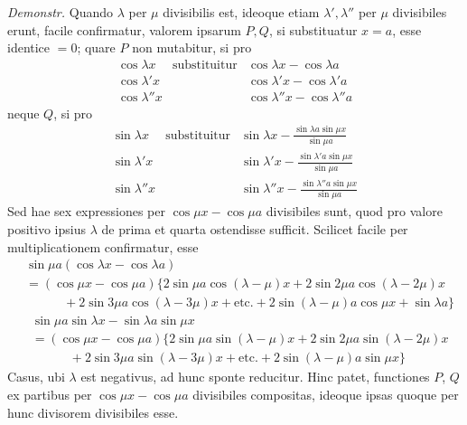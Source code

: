 \textit{Demonstr.} Quando $\lambda$ per $\mu$ divisibilis est, ideoque etiam $\lambda',\lambda''$ per $\mu$ divisibiles erunt, facile confirmatur, valorem ipsarum $P,Q$, si substituatur $x=a$, esse identice $=0$; quare $P$ non mutabitur, si pro
\[
\begin{array}{lll}
\cos\lambda x&\text{substituitur}&\cos\lambda x-\cos\lambda a\\
\cos\lambda'x&&\cos\lambda'x-\cos\lambda'a\\
\cos\lambda''x&&\cos\lambda''x-\cos\lambda''a
\end{array}
\]
neque $Q$, si pro
\[
\begin{array}{lll}
\sin\lambda x&\text{substituitur}&\displaystyle\sin\lambda x-\frac{\sin\lambda a\sin\mu x}{\sin\mu a}\\[6pt]
\sin\lambda'x&&\displaystyle\sin\lambda'x-\frac{\sin\lambda'a\sin\mu x}{\sin\mu a}\\[6pt]
\sin\lambda''x&&\displaystyle\sin\lambda''x-\frac{\sin\lambda''a\sin\mu x}{\sin\mu a}
\end{array}
\]
Sed hae sex expressiones per $\cos\mu x-\cos\mu a$ divisibiles sunt, quod pro valore positivo ipsius $\lambda$ de prima et quarta ostendisse sufficit. Scilicet facile per multiplicationem confirmatur, esse
\[
\begin{aligned}
&\sin\mu a(\cos\lambda x-\cos\lambda a)\\[5pt]
&=(\cos\mu x-\cos\mu a)\{2\sin\mu a\cos(\lambda-\mu)x+2\sin 2\mu a\cos(\lambda-2\mu)x\\[5pt]
&\quad \qquad+2\sin 3\mu a\cos(\lambda-3\mu)x+\text{etc.}+2\sin(\lambda-\mu)a\cos\mu x+\sin\lambda a\}
\end{aligned}
\]
\[
\begin{aligned}
&\sin\mu a\sin\lambda x-\sin\lambda a\sin\mu x\\[5pt]
&=(\cos\mu x-\cos\mu a)\{2\sin\mu a\sin(\lambda-\mu)x+2\sin 2\mu a\sin(\lambda-2\mu)x\\[5pt]
&\quad \qquad+2\sin 3\mu a\sin(\lambda-3\mu)x+\text{etc.}+2\sin(\lambda-\mu)a\sin\mu x\}
\end{aligned}
\]
Casus, ubi $\lambda$ est negativus, ad hunc sponte reducitur. Hinc patet, functiones
$P$, $Q$ ex partibus per $\cos\mu x-\cos\mu a$ divisibiles compositas, ideoque ipsas quoque per hunc divisorem divisibiles esse.

